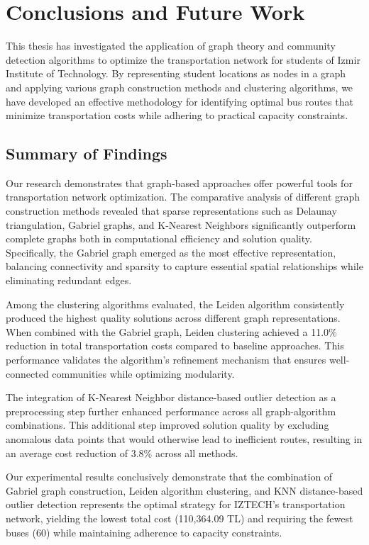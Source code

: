 \chapter{Conclusions and Future Work}
\label{ch:conclusions}

This thesis has investigated the application of graph theory and community detection algorithms to optimize the transportation network for students of Izmir Institute of Technology. By representing student locations as nodes in a graph and applying various graph construction methods and clustering algorithms, we have developed an effective methodology for identifying optimal bus routes that minimize transportation costs while adhering to practical capacity constraints.

\section{Summary of Findings}

Our research demonstrates that graph-based approaches offer powerful tools for transportation network optimization. The comparative analysis of different graph construction methods revealed that sparse representations such as Delaunay triangulation, Gabriel graphs, and K-Nearest Neighbors significantly outperform complete graphs both in computational efficiency and solution quality. Specifically, the Gabriel graph emerged as the most effective representation, balancing connectivity and sparsity to capture essential spatial relationships while eliminating redundant edges.

Among the clustering algorithms evaluated, the Leiden algorithm consistently produced the highest quality solutions across different graph representations. When combined with the Gabriel graph, Leiden clustering achieved a 11.0\% reduction in total transportation costs compared to baseline approaches. This performance validates the algorithm's refinement mechanism that ensures well-connected communities while optimizing modularity.

The integration of K-Nearest Neighbor distance-based outlier detection as a preprocessing step further enhanced performance across all graph-algorithm combinations. This additional step improved solution quality by excluding anomalous data points that would otherwise lead to inefficient routes, resulting in an average cost reduction of 3.8\% across all methods.

Our experimental results conclusively demonstrate that the combination of Gabriel graph construction, Leiden algorithm clustering, and KNN distance-based outlier detection represents the optimal strategy for IZTECH's transportation network, yielding the lowest total cost (110,364.09 TL) and requiring the fewest buses (60) while maintaining adherence to capacity constraints.

